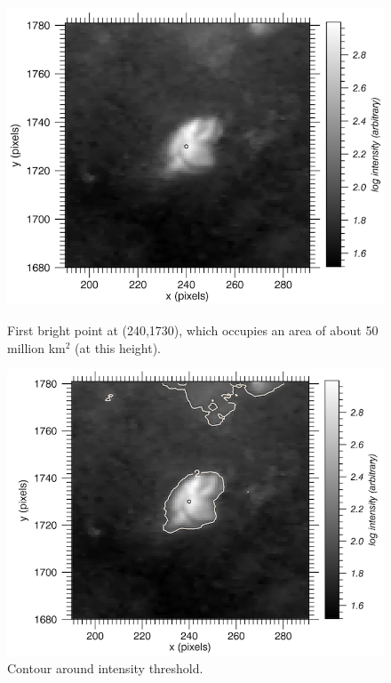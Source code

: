 \documentclass[preprint]{aastex}
\begin{document}
\begin{figure}[htb!]
    \begin{minipage}[b]{0.45\linewidth}
        \includegraphics[width=\textwidth]{../figures/bp1_image.png}
        \caption{First bright point at (240,1730), which occupies an
        area of about 50 million km$^2$ (at this height).}
    \end{minipage}
    \quad
    \begin{minipage}[b]{0.45\linewidth}
        \includegraphics[width=\textwidth]{../figures/bp1_contour.png}
        \caption{Contour around intensity threshold.}
    \end{minipage}
\end{figure}
\end{document}
